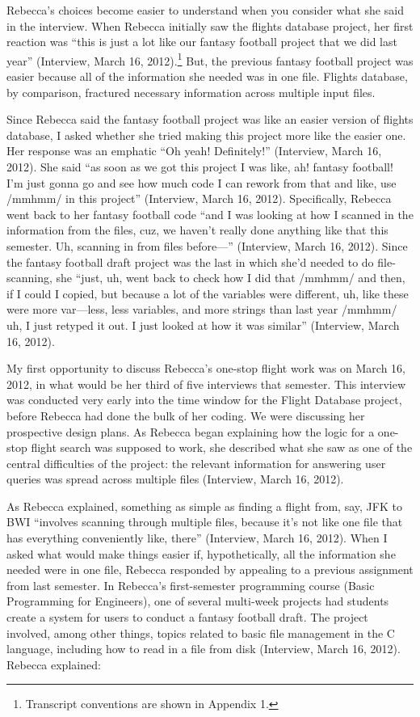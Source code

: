Rebecca's choices become easier to understand when you consider what she said in the interview. When Rebecca initially saw the flights database project, her first reaction was ``this is just a lot like our fantasy football project that we did last year'' (Interview, March 16, 2012).\footnote{Transcript conventions are shown in Appendix 1.} But, the previous fantasy football project was easier because all of the information she needed was in one file. Flights database, by comparison, fractured necessary information across multiple input files.

Since Rebecca said the fantasy football project was like an easier version of flights database, I asked whether she tried making this project more like the easier one. Her response was an emphatic ``Oh yeah! Definitely!'' (Interview, March 16, 2012). She said ``as soon as we got this project I was like, ah! fantasy football! I'm just gonna go and see how much code I can rework from that and like, use /mmhmm/ in this project'' (Interview, March 16, 2012). Specifically, Rebecca went back to her fantasy football code ``and I was looking at how I scanned in the information from the files, cuz, we haven't really done anything like that this semester. Uh, scanning in from files before---'' (Interview, March 16, 2012). Since the fantasy football draft project was the last in which she'd needed to do file-scanning, she ``just, uh, went back to check how I did that /mmhmm/ and then, if I could I copied, but because a lot of the variables were different, uh, like these were more var---less, less variables, and more strings than last year /mmhmm/ uh, I just retyped it out. I just looked at how it was similar'' (Interview, March 16, 2012).

My first opportunity to discuss Rebecca's one-stop flight work was on March 16, 2012, in what would be her third of five interviews that semester. This interview was conducted very early into the time window for the Flight Database project, before Rebecca had done the bulk of her coding. We were discussing her prospective design plans. As Rebecca began explaining how the logic for a one-stop flight search was supposed to work, she described what she saw as one of the central difficulties of the project: the relevant information for answering user queries was spread across multiple files (Interview, March 16, 2012).

As Rebecca explained, something as simple as finding a flight from, say, JFK to BWI ``involves scanning through multiple files, because it's not like one file that has everything conveniently like, there'' (Interview, March 16, 2012). When I asked what would make things easier if, hypothetically, all the information she needed were in one file, Rebecca responded by appealing to a previous assignment from last semester. In Rebecca's first-semester programming course (Basic Programming for Engineers), one of several multi-week projects had students create a system for users to conduct a fantasy football draft. The project involved, among other things, topics related to basic file management in the C language, including how to read in a file from disk (Interview, March 16, 2012). Rebecca explained:

